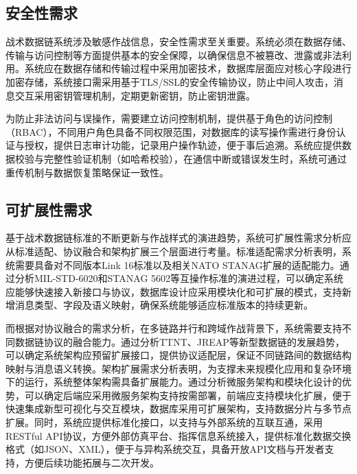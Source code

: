 \subsection{安全性需求}
战术数据链系统涉及敏感作战信息，安全性需求至关重要。系统必须在数据存储、传输与访问控制等方面提供基本的安全保障，以确保信息不被篡改、泄露或非法利用\cite{Collins_TTNT_immersion_2020}。系统应在数据存储和传输过程中采用加密技术，数据库层面应对核心字段进行加密存储，系统接口需采用基于TLS/SSL的安全传输协议，防止中间人攻击，消息交互采用密钥管理机制，定期更新密钥，防止密钥泄露\cite{Euromids_2025_contract}。

为防止非法访问与误操作，需要建立访问控制机制，提供基于角色的访问控制（RBAC），不同用户角色具备不同权限范围，对数据库的读写操作需进行身份认证与授权，提供日志审计功能，记录用户操作轨迹，便于事后追溯\cite{GovConWire_Euromids_2025}。系统应提供数据校验与完整性验证机制（如哈希校验），在通信中断或错误发生时，系统可通过重传机制与数据恢复策略保证一致性\cite{musumeci_2014_ietrsn_pulseblank,borio_2013_ietspr_pulseblanking,houdzoumis2009_jn,wu_2016_taes_dme_wp,huo_2015_ieeecl_meb,huo_2015_comex_mixed_interference,mitch_2016_nav_chirp_geolocation,vandermerwe_2023_nav_mpanf}。

\subsection{可扩展性需求}
基于战术数据链标准的不断更新与作战样式的演进趋势，系统可扩展性需求分析应从标准适配、协议融合和架构扩展三个层面进行考量\cite{CJCS_Manuals_Library}。标准适配需求分析表明，系统需要具备对不同版本Link 16标准以及相关NATO STANAG扩展的适配能力。通过分析MIL-STD-6020和STANAG 5602等互操作标准的演进过程，可以确定系统应能够快速接入新接口与协议，数据库设计应采用模块化和可扩展的模式，支持新增消息类型、字段及语义映射，确保系统能够适应标准版本的持续更新\cite{CJCS_Instructions_Library,ASSIST_3011_2023}。

而根据对协议融合的需求分析，在多链路并行和跨域作战背景下，系统需要支持不同数据链协议的融合能力。通过分析TTNT、JREAP等新型数据链的发展趋势，可以确定系统架构应预留扩展接口，提供协议适配层，保证不同链路间的数据结构映射与消息语义转换\cite{ASSIST_6020_2025,qin2013_gpssol}。架构扩展需求分析表明，为支撑未来规模化应用和复杂环境下的运行，系统整体架构需具备扩展能力。通过分析微服务架构和模块化设计的优势，可以确定后端应采用微服务架构支持按需部署，前端应支持模块化扩展，便于快速集成新型可视化与交互模块，数据库采用可扩展架构，支持数据分片与多节点扩展\cite{fried_loeliger1979_navigation}。同时，系统应提供标准化接口，以支持与外部系统的互联互通，采用RESTful API协议，方便外部仿真平台、指挥信息系统接入，提供标准化数据交换格式（如JSON、XML），便于与异构系统交互，具备开放API文档与开发者支持，方便后续功能拓展与二次开发\cite{baruffa2013_jsps}。
